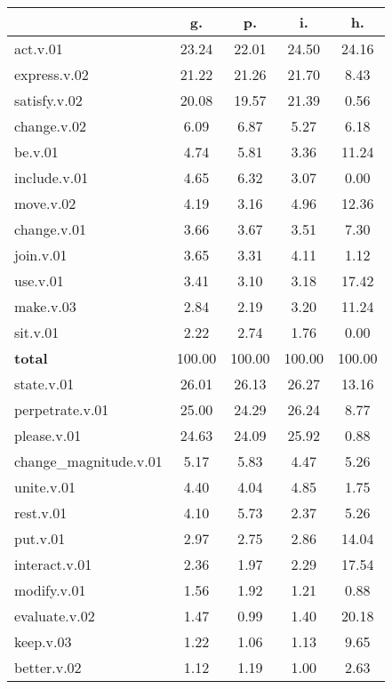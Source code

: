 \begin{table}[h!]
\begin{center}
\begin{tabular}{| l || c | c | c | c |}\hline
 & {\bf g.} & {\bf p.} & {\bf i.} & {\bf h.} \\\hline\hline
act.v.01 & 23.24  & 22.01  & 24.50  & 24.16 \\\hline
express.v.02 & 21.22  & 21.26  & 21.70  & 8.43 \\\hline
satisfy.v.02 & 20.08  & 19.57  & 21.39  & 0.56 \\\hline
change.v.02 & 6.09  & 6.87  & 5.27  & 6.18 \\\hline
be.v.01 & 4.74  & 5.81  & 3.36  & 11.24 \\\hline
include.v.01 & 4.65  & 6.32  & 3.07  & 0.00 \\\hline
move.v.02 & 4.19  & 3.16  & 4.96  & 12.36 \\\hline
change.v.01 & 3.66  & 3.67  & 3.51  & 7.30 \\\hline
join.v.01 & 3.65  & 3.31  & 4.11  & 1.12 \\\hline
use.v.01 & 3.41  & 3.10  & 3.18  & 17.42 \\\hline
make.v.03 & 2.84  & 2.19  & 3.20  & 11.24 \\\hline
sit.v.01 & 2.22  & 2.74  & 1.76  & 0.00 \\\hline\hline
{{\bf total}} & 100.00  & 100.00  & 100.00  & 100.00 \\\hline\hline\hline
state.v.01 & 26.01  & 26.13  & 26.27  & 13.16 \\\hline
perpetrate.v.01 & 25.00  & 24.29  & 26.24  & 8.77 \\\hline
please.v.01 & 24.63  & 24.09  & 25.92  & 0.88 \\\hline
change\_magnitude.v.01 & 5.17  & 5.83  & 4.47  & 5.26 \\\hline
unite.v.01 & 4.40  & 4.04  & 4.85  & 1.75 \\\hline
rest.v.01 & 4.10  & 5.73  & 2.37  & 5.26 \\\hline
put.v.01 & 2.97  & 2.75  & 2.86  & 14.04 \\\hline
interact.v.01 & 2.36  & 1.97  & 2.29  & 17.54 \\\hline
modify.v.01 & 1.56  & 1.92  & 1.21  & 0.88 \\\hline
evaluate.v.02 & 1.47  & 0.99  & 1.40  & 20.18 \\\hline
keep.v.03 & 1.22  & 1.06  & 1.13  & 9.65 \\\hline
better.v.02 & 1.12  & 1.19  & 1.00  & 2.63 \\\hline\hline

\end{tabular}
\end{center}
\end{table}

